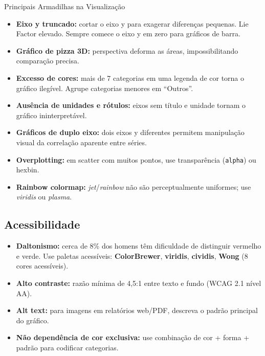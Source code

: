 \documentclass[12pt,a4paper]{article}
\begin{document}
\begin{atencaobox}{Principais Armadilhas na Visualização}
\begin{itemize}
  \item \textbf{Eixo y truncado:} cortar o eixo y para exagerar diferenças pequenas. Lie Factor elevado. Sempre comece o eixo y em zero para gráficos de barra.
  \item \textbf{Gráfico de pizza 3D:} perspectiva deforma as áreas, impossibilitando comparação precisa.
  \item \textbf{Excesso de cores:} mais de 7 categorias em uma legenda de cor torna o gráfico ilegível. Agrupe categorias menores em ``Outros''.
  \item \textbf{Ausência de unidades e rótulos:} eixos sem título e unidade tornam o gráfico ininterpretável.
  \item \textbf{Gráficos de duplo eixo:} dois eixos y diferentes permitem manipulação visual da correlação aparente entre séries.
  \item \textbf{Overplotting:} em scatter com muitos pontos, use transparência (\texttt{alpha}) ou hexbin.
  \item \textbf{Rainbow colormap:} \textit{jet}/\textit{rainbow} não são perceptualmente uniformes; use \textit{viridis} ou \textit{plasma}.
\end{itemize}
\end{atencaobox}

\subsection{Acessibilidade}

\begin{itemize}
  \item \textbf{Daltonismo:} cerca de 8\% dos homens têm dificuldade de distinguir vermelho e verde. Use paletas acessíveis: \textbf{ColorBrewer}, \textbf{viridis}, \textbf{cividis}, \textbf{Wong} (8 cores acessíveis).
  \item \textbf{Alto contraste:} razão mínima de 4,5:1 entre texto e fundo (WCAG 2.1 nível AA).
  \item \textbf{Alt text:} para imagens em relatórios web/PDF, descreva o padrão principal do gráfico.
  \item \textbf{Não dependência de cor exclusiva:} use combinação de cor + forma + padrão para codificar categorias.
\end{itemize}

\end{document}
